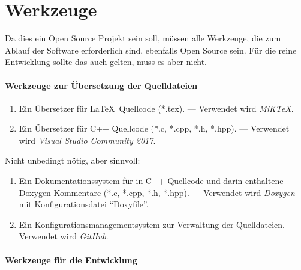 \section     {Werkzeuge}%
\label   {sec-Werkzeuge}

Da dies ein Open Source Projekt sein soll, müssen alle Werkzeuge, die zum Ablauf der Software erforderlich sind, ebenfalls Open Source sein.
Für die reine Entwicklung sollte das auch gelten, muss es aber nicht.

\paragraph{Werkzeuge zur Übersetzung der Quelldateien}%

\begin{enumerate}

	\item\label{Werkzeug:LaTeX}
	Ein Übersetzer für \LaTeX\ Quellcode (*.tex).
	--- Verwendet wird \emph{MiK\TeX}.

	\item\label{Werkzeug:Cpp}
	Ein Übersetzer für C++ Quellcode (*.c, *.cpp, *.h, *.hpp).
	--- Verwendet wird \emph{Visual Studio Community 2017}.

	\setcounter{Enumi}{\value{enumi}}%
\end{enumerate}
%
Nicht unbedingt nötig, aber sinnvoll:
\begin{enumerate}
	\setcounter{enumi}{\value{Enumi}}%

	\item\label{Werkzeug:Dokumentation}
	Ein Dokumentationssystem für in C++ Quellcode und darin enthaltene Doxygen Kommentare (*.c, *.cpp, *.h, *.hpp).
	--- Verwendet wird \emph{Doxygen} mit Konfigurationsdatei "`Doxyfile"'.

	\item\label{Werkzeug:Konfigurationsmanagement}
	Ein Konfigurationsmanagementsystem zur Verwaltung der Quelldateien.
	--- Verwendet wird \emph{GitHub}.

	\setcounter{Enumi}{\value{enumi}}%
\end{enumerate}

\paragraph{Werkzeuge für die Entwicklung}%

